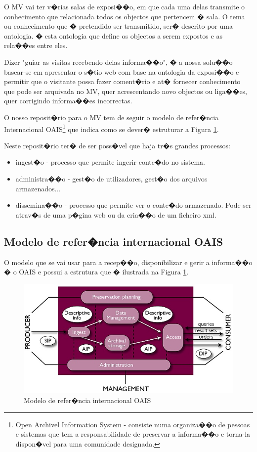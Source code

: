 \documentclass[a4paper,titlepage]{article}
\begin{document}
	O MV vai ter v�rias salas de exposi��o, em que cada uma delas transmite o conhecimento que relacionada todos os objectos que pertencem � sala. O tema ou conhecimento que � pretendido ser transmitido, ser� descrito por uma ontologia. � esta ontologia que define os objectos a serem expostos e as rela��es entre eles.
	
	Dizer "guiar as visitas recebendo delas informa��o", � a nossa solu��o basear-se em apresentar o s�tio web com base na ontologia da exposi��o e permitir que o visitante possa fazer coment�rio e at� fornecer conhecimento que pode ser arquivada no MV, quer acrescentando novo objectos ou liga��es, quer corrigindo informa��es incorrectas.
	
	O nosso reposit�rio para o MV tem de seguir o modelo de refer�ncia Internacional OAIS\footnote{Open Archivel Information System - consiste numa organiza��o de pessoas e sistemas que tem a responsabilidade de preservar a informa��o e torna-la dispon�vel para uma comunidade designada.} que indica como se dever� estruturar a Figura \ref{fig:esquema_oais}.
	
Neste reposit�rio ter� de ser poss�vel que haja tr�s grandes processos:
	\begin{itemize}
		\item ingest�o - processo que permite ingerir conte�do no sistema.
		\item administra��o - gest�o de utilizadores, gest�o dos arquivos armazenados...
		\item dissemina��o - processo que permite ver o conte�do armazenado. Pode ser atrav�s de uma p�gina web ou da cria��o de um ficheiro xml.
	\end{itemize}

\subsection{Modelo de refer�ncia internacional OAIS}
	O modelo que se vai usar para a recep��o, disponibilizar e gerir a informa��o � o OAIS e possui a estrutura que � ilustrada na Figura \ref{fig:esquema_oais}.
	
\begin{figure}[H]
 \centering
 \includegraphics[scale=0.8]{./imagens/OAIS.png}
 \caption{Modelo de refer�ncia internacional OAIS}
 \label{fig:esquema_oais}
\end{figure}
\end{document}
